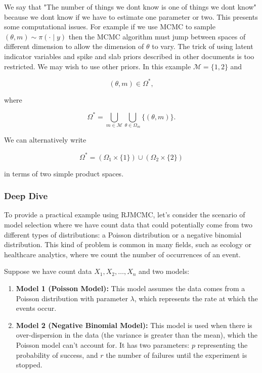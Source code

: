 \documentclass[10pt]{article}
\begin{document}
We say that "The number of things we dont know is one of things we dont know" because we dont know if we have to estimate one parameter or two. This presents some computational issues. For example if we use MCMC to sample $(\theta, m) \sim \pi(\cdot \mid y)$ then the MCMC algorithm must jump between spaces of different dimension to allow the dimension of $\theta$ to vary. The trick of using latent indicator variables and spike and slab priors described in other documents is too restricted. We may wish to use other priors. In this example $\mathcal{M}=\{1,2\}$ and

$$
(\theta, m) \in \Omega^*,
$$

where

$$
\Omega^*=\bigcup_{m \in \mathcal{M}} \bigcup_{\theta \in \Omega_m}\{(\theta, m)\} .
$$

We can alternatively write

$$
\Omega^*=\left(\Omega_1 \times\{1\}\right) \cup\left(\Omega_2 \times\{2\}\right)
$$

in terms of two simple product spaces.

\subsubsection*{Deep Dive}
To provide a practical example using RJMCMC, let's consider the scenario of model selection where we have count data that could potentially come from two different types of distributions: a Poisson distribution or a negative binomial distribution. This kind of problem is common in many fields, such as ecology or healthcare analytics, where we count the number of occurrences of an event.

Suppose we have count data \( X_1, X_2, \ldots, X_n \) and two models:

\begin{enumerate}
  \item \textbf{Model 1 (Poisson Model):} This model assumes the data comes from a Poisson distribution with parameter \( \lambda \), which represents the rate at which the events occur.

  \item \textbf{Model 2 (Negative Binomial Model):} This model is used when there is over-dispersion in the data (the variance is greater than the mean), which the Poisson model can't account for. It has two parameters: \( p \) representing the probability of success, and \( r \) the number of failures until the experiment is stopped.

\end{enumerate}
\end{document}
